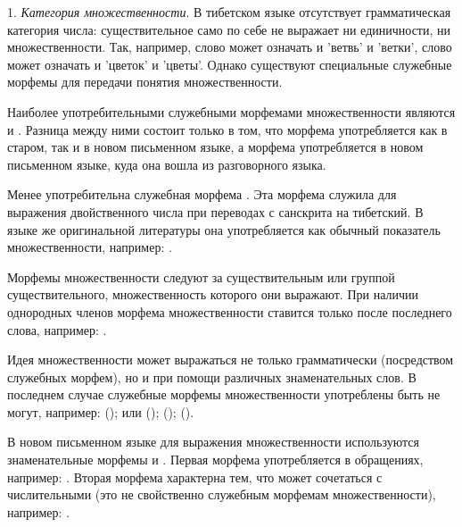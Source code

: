 1. \emph{Категория множественности}. В тибетском языке отсутствует грамматическая категория числа: существительное само по себе не выражает ни единичности, ни множественности. Так, например,
слово  может означать и 'ветвь' и 'ветки',
слово  может означать и 'цветок' и 'цветы'. Однако существуют специальные служебные морфемы для передачи понятия множественности.

Наиболее употребительными служебными морфемами множественности являются  и . Разница между ними состоит только в том, что морфема  употребляется как в старом, так и в новом письменном языке, а морфема  употребляется в новом письменном языке, куда она вошла из разговорного языка.

Менее употребительна служебная морфема .
Эта морфема служила для выражения двойственного числа при переводах с санскрита на тибетский. В языке же оригинальной литературы она употребляется как обычный показатель множественности, например: .

Морфемы множественности следуют за существительным или группой существительного, множественность которого они выражают. При наличии однородных членов морфема множественности ставится только после последнего слова, например: .

Идея множественности может выражаться не только грамматически (посредством служебных морфем), но и при помощи различных знаменательных слов. В последнем случае служебные морфемы множественности употреблены быть не могут, например:
 ();
 или  ();
 ();
 ().

В новом письменном языке для выражения множественности используются знаменательные морфемы  и .
Первая морфема употребляется в обращениях, например: . Вторая морфема характерна тем, что может сочетаться с числительными (это не свойственно служебным морфемам множественности), например:
.

